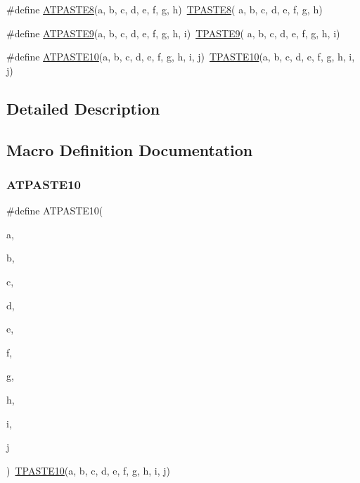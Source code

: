 \begin{DoxyCompactItemize}
\item 
\#define \mbox{\hyperlink{group__group__sam0__utils__tpaste_ga303651436fcc8283bd17c13578476c8e}{A\+T\+P\+A\+S\+T\+E8}}(a,  b,  c,  d,  e,  f,  g,  h)~\mbox{\hyperlink{group__group__sam0__utils__tpaste_gaf7aff743d5c0d66a81a13268b1a7e222}{T\+P\+A\+S\+T\+E8}}( a, b, c, d, e, f, g, h)
\item 
\#define \mbox{\hyperlink{group__group__sam0__utils__tpaste_ga5305e79258b2256febfac6ebec8838c2}{A\+T\+P\+A\+S\+T\+E9}}(a,  b,  c,  d,  e,  f,  g,  h,  i)~\mbox{\hyperlink{group__group__sam0__utils__tpaste_ga5440e5a665d859bec7c3527312d0889d}{T\+P\+A\+S\+T\+E9}}( a, b, c, d, e, f, g, h, i)
\item 
\#define \mbox{\hyperlink{group__group__sam0__utils__tpaste_ga3b9c4ca2ffbcec13ec3083ab95664ac9}{A\+T\+P\+A\+S\+T\+E10}}(a,  b,  c,  d,  e,  f,  g,  h,  i,  j)~\mbox{\hyperlink{group__group__sam0__utils__tpaste_ga0235b2e4ccf7a5b1d022a729a17a78a2}{T\+P\+A\+S\+T\+E10}}(a, b, c, d, e, f, g, h, i, j)
\end{DoxyCompactItemize}


\subsection{Detailed Description}


\subsection{Macro Definition Documentation}
\mbox{\label{group__group__sam0__utils__tpaste_ga3b9c4ca2ffbcec13ec3083ab95664ac9}} 
\subsubsection{\texorpdfstring{ATPASTE10}{ATPASTE10}}
{\footnotesize\ttfamily \#define A\+T\+P\+A\+S\+T\+E10(\begin{DoxyParamCaption}\item[{}]{a,  }\item[{}]{b,  }\item[{}]{c,  }\item[{}]{d,  }\item[{}]{e,  }\item[{}]{f,  }\item[{}]{g,  }\item[{}]{h,  }\item[{}]{i,  }\item[{}]{j }\end{DoxyParamCaption})~\mbox{\hyperlink{group__group__sam0__utils__tpaste_ga0235b2e4ccf7a5b1d022a729a17a78a2}{T\+P\+A\+S\+T\+E10}}(a, b, c, d, e, f, g, h, i, j)}

